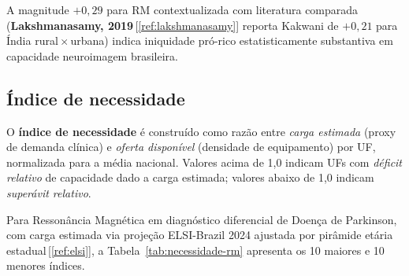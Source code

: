 \documentclass[12pt,a4paper,oneside]{article}
\begin{document}
A magnitude $+0{,}29$ para RM \textemdash{} contextualizada com
literatura comparada (\textbf{Lakshmanasamy, 2019}\,[\ref{ref:lakshmanasamy}]
reporta Kakwani de $+0{,}21$ para Índia rural\,$\times$\,urbana)
\textemdash{} indica iniquidade pró-rico estatisticamente
substantiva em capacidade neuroimagem brasileira.

\subsection{Índice de necessidade}\label{sub:necessidade}

O \textbf{índice de necessidade} é construído como razão entre
\textit{carga estimada} (proxy de demanda clínica) e \textit{oferta
disponível} (densidade de equipamento) por UF, normalizada para a
média nacional. Valores acima de 1,0 indicam UFs com
\textit{déficit relativo} de capacidade dado a carga estimada;
valores abaixo de 1,0 indicam \textit{superávit relativo}.

Para Ressonância Magnética em diagnóstico diferencial de Doença
de Parkinson, com carga estimada via projeção ELSI-Brazil 2024
ajustada por pirâmide etária estadual\,[\ref{ref:elsi}], a
Tabela~\ref{tab:necessidade-rm} apresenta os 10 maiores e 10
menores índices.
\end{document}
